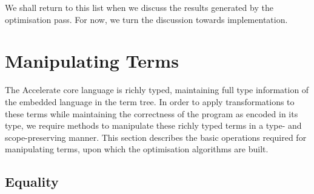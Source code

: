 We shall return to this list when we discuss the results generated by the
optimisation pass. For now, we turn the discussion towards implementation.



% 
% 
% 
% 

\section{Manipulating Terms}
\label{sec:manipulating_terms}

The Accelerate core language is richly typed, maintaining full type information
of the embedded language in the term tree. In order to apply transformations to
these terms while maintaining the correctness of the program as encoded in its
type, we require methods to manipulate these richly typed terms in a type- and
scope-preserving manner. This section describes the basic operations required
for manipulating terms, upon which the optimisation algorithms are built.


\subsection{Equality}

